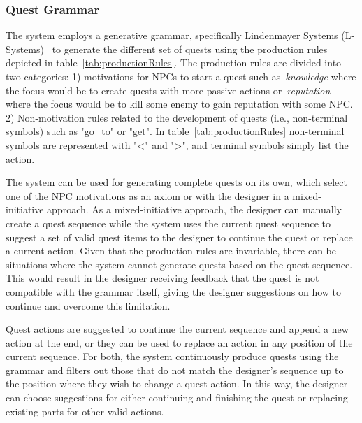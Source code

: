 
\subsubsection{Quest Grammar}

The system employs a generative grammar, specifically Lindenmayer Systems (L-Systems)~\cite{p8Lindenmayer1996-LSystems} to generate the different set of quests using the production rules depicted in table~\ref{tab:productionRules}. The production rules are divided into two categories: 1) motivations for NPCs to start a quest such as~\emph{knowledge} where the focus would be to create quests with more passive actions or~\emph{reputation} where the focus would be to kill some enemy to gain reputation with some NPC. 2) Non-motivation rules related to the development of quests (i.e., non-terminal symbols) such as "go\_to" or "get". In table~\ref{tab:productionRules} non-terminal symbols are represented with "<" and ">", and terminal symbols simply list the action.


The system can be used for generating complete quests on its own, which select one of the NPC motivations as an axiom or with the designer in a mixed-initiative approach. As a mixed-initiative approach, the designer can manually create a quest sequence while the system uses the current quest sequence to suggest a set of valid quest items to the designer to continue the quest or replace a current action. Given that the production rules are invariable, there can be situations where the system cannot generate quests based on the quest sequence. This would result in the designer receiving feedback that the quest is not compatible with the grammar itself, giving the designer suggestions on how to continue and overcome this limitation.

Quest actions are suggested to continue the current sequence and append a new action at the end, or they can be used to replace an action in any position of the current sequence. For both, the system continuously produce quests using the grammar and filters out those that do not match the designer's sequence up to the position where they wish to change a quest action. In this way, the designer can choose suggestions for either continuing and finishing the quest or replacing existing parts for other valid actions.

